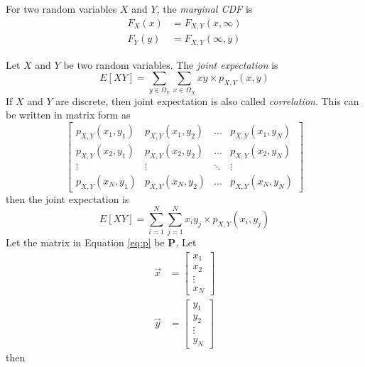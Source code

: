 For two random variables $X$ and $Y$,
the \emph{marginal CDF} is
\begin{align}
    F_X(x) & = F_{X,Y}(x, \infty) \\
    F_Y(y) & = F_{X,Y}(\infty, y)
\end{align}

Let $X$ and $Y$ be two random variables.
The \emph{joint expectation} is
\begin{equation}
    E[XY] = \sum_{y\in \Omega_Y}\sum_{x\in \Omega_X}xy \times p_{X,Y}(x,y)
\end{equation}
If $X$ and $Y$ are discrete, then joint
expectation is also called \emph{correlation}.
This can be written in matrix form as
\begin{equation}\label{eq:p}
    \begin{bmatrix}
        p_{X,Y}(x_1, y_1) & p_{X,Y}(x_1, y_2) & \dots  & p_{X,Y}(x_1, y_N) \\
        p_{X,Y}(x_2, y_1) & p_{X,Y}(x_2, y_2) & \dots  & p_{X,Y}(x_2, y_N) \\
        \vdots            & \vdots            & \ddots & \vdots            \\
        p_{X,Y}(x_N, y_1) & p_{X,Y}(x_N, y_2) & \dots  & p_{X,Y}(x_N, y_N)
    \end{bmatrix}
\end{equation}
then the joint expectation is
\begin{equation}
    E[XY] = \sum_{i=1}^{N}\sum_{j=1}^{N}x_i y_j \times p_{X,Y}(x_i, y_j)
\end{equation}
Let the matrix in Equation \ref{eq:p} be $\mathbf{P}$.
Let
\begin{align}
    \vec{x} & = \begin{bmatrix}
                    x_1    \\
                    x_2    \\
                    \vdots \\
                    x_N
                \end{bmatrix} \\
    \vec{y} & = \begin{bmatrix}
                    y_1    \\
                    y_2    \\
                    \vdots \\
                    y_N
                \end{bmatrix}
\end{align}
then
